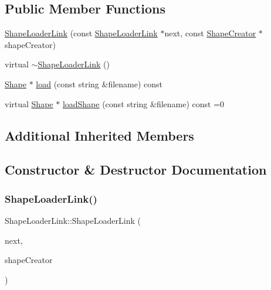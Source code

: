 \subsection*{Public Member Functions}
\begin{DoxyCompactItemize}
\item 
\hyperlink{class_shape_loader_link_a79c836d9ee6912b2ad018f736264bc3b}{Shape\+Loader\+Link} (const \hyperlink{class_shape_loader_link}{Shape\+Loader\+Link} $\ast$next, const \hyperlink{class_shape_creator}{Shape\+Creator} $\ast$shape\+Creator)
\item 
virtual \hyperlink{class_shape_loader_link_ac1d209f646bb69bae5ba34d7ae132ba1}{$\sim$\+Shape\+Loader\+Link} ()
\item 
\hyperlink{class_shape}{Shape} $\ast$ \hyperlink{class_shape_loader_link_a0637abbe648488e98f4130bd9827bd72}{load} (const string \&filename) const
\item 
virtual \hyperlink{class_shape}{Shape} $\ast$ \hyperlink{class_shape_loader_link_a02f18caa405a1d5a1e24ed5b7bf08320}{load\+Shape} (const string \&filename) const =0
\end{DoxyCompactItemize}
\subsection*{Additional Inherited Members}


\subsection{Constructor \& Destructor Documentation}
\hypertarget{class_shape_loader_link_a79c836d9ee6912b2ad018f736264bc3b}{}\label{class_shape_loader_link_a79c836d9ee6912b2ad018f736264bc3b} 
\subsubsection{\texorpdfstring{Shape\+Loader\+Link()}{ShapeLoaderLink()}}
{\footnotesize\ttfamily Shape\+Loader\+Link\+::\+Shape\+Loader\+Link (\begin{DoxyParamCaption}\item[{const \hyperlink{class_shape_loader_link}{Shape\+Loader\+Link} $\ast$}]{next,  }\item[{const \hyperlink{class_shape_creator}{Shape\+Creator} $\ast$}]{shape\+Creator }\end{DoxyParamCaption})}

